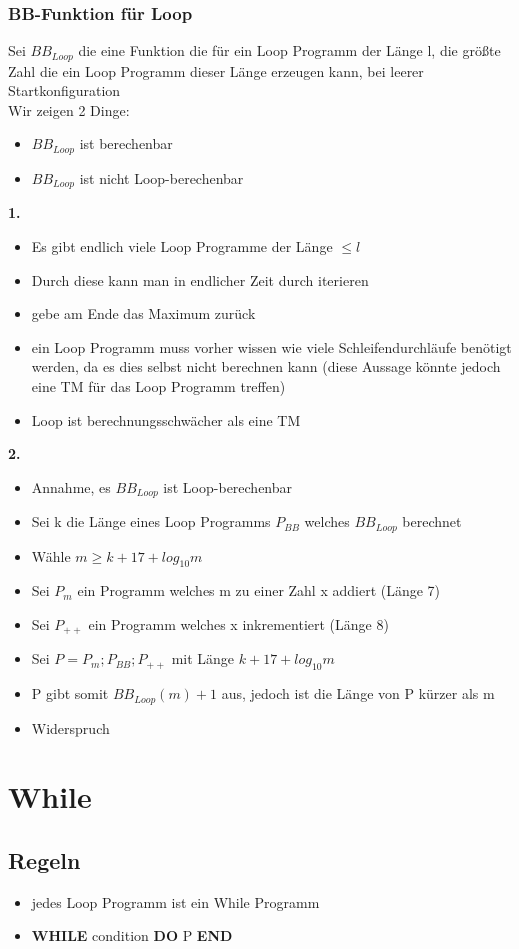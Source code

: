 \documentclass[12pt,a4paper]{article}
\begin{document}
\subsubsection{BB-Funktion für Loop}
Sei $BB_{Loop}$ die eine Funktion die für ein Loop Programm der Länge l, die größte Zahl die ein Loop Programm dieser Länge erzeugen kann, bei leerer Startkonfiguration\\
Wir zeigen 2 Dinge:
\begin{itemize}
\item $BB_{Loop}$ ist berechenbar
\item $BB_{Loop}$ ist nicht Loop-berechenbar
\end{itemize}
\textbf{1.}
\begin{itemize}
\item Es gibt endlich viele Loop Programme der Länge $\leq l$
\item Durch diese kann man in endlicher Zeit durch iterieren
\item gebe am Ende das Maximum zurück
\item ein Loop Programm muss vorher wissen wie viele Schleifendurchläufe benötigt werden, da es dies selbst nicht berechnen kann (diese Aussage könnte jedoch eine TM für das Loop Programm treffen)
\item Loop ist berechnungsschwächer als eine TM
\end{itemize}
\textbf{2.}
\begin{itemize}
\item Annahme, es $BB_{Loop}$ ist Loop-berechenbar
\item Sei k die Länge eines Loop Programms $P_{BB}$ welches $BB_{Loop}$ berechnet
\item Wähle $m \geq k + 17 + log_{10} m$
\item Sei $P_m$ ein Programm welches m zu einer Zahl x addiert (Länge 7)
\item Sei $P_{++}$ ein Programm welches x inkrementiert (Länge 8)
\item Sei $P = P_m;P_{BB};P_{++}$ mit Länge $k + 17 + log_{10} m$
\item P gibt somit $BB_{Loop}(m) + 1$ aus, jedoch ist die Länge von P kürzer als m
\item Widerspruch
\end{itemize}

\section{While}
\subsection{Regeln}
\begin{itemize}
\item jedes Loop Programm ist ein While Programm
\item \textbf{WHILE} condition \textbf{DO} P \textbf{END}
\end{itemize}
\end{document}

